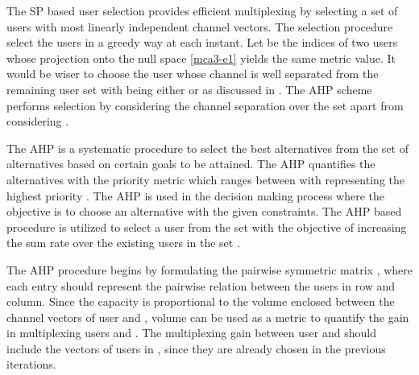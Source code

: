 
The \ac{SP} based user selection \cite{dimic2005downlink,shen2006low,antti_user_selection,sus2006zfbf,zhang2007user} provides efficient multiplexing by selecting a set of users with most linearly independent channel vectors. The selection procedure select the users in a greedy way at each instant. Let  be the indices of two users whose projection onto the null space \eqref{mca3-e1} yields the same metric value. It would be wiser to choose the user whose channel is well separated from the remaining user set  with  being either  or  as discussed in \cite{wmmse_shi}. The \ac{AHP} scheme performs selection by considering the channel separation over the set  apart from considering .

The \ac{AHP} is a systematic procedure to select the best alternatives from the set of alternatives based on certain goals to be attained. The \ac{AHP} quantifies the alternatives with the priority metric which ranges between \me{[0,1]} with  representing the highest priority \cite{saaty2008decision}. The \ac{AHP} is used in the decision making process where the objective is to choose an alternative with the given constraints. The \ac{AHP} based procedure is utilized to select a user from the set  with the objective of increasing the sum rate over the existing users in the set .

The \ac{AHP} procedure begins by formulating the pairwise symmetric matrix , where each entry  should represent the pairwise relation between the users in  row and  column. Since the capacity is proportional to the volume enclosed between the channel vectors of user  and  \cite{ko2012determinant}, volume can be used as a metric to quantify the gain in multiplexing users  and . The multiplexing gain between user  and  should include the vectors of users in , since they are already chosen in the previous iterations.


